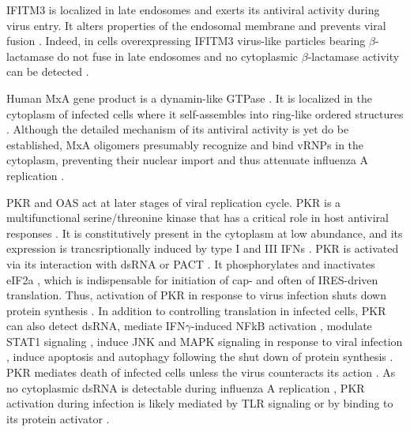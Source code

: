 		\gls{IFITM3} is localized in late endosomes and exerts its antiviral activity during virus entry. It alters properties of the endosomal membrane and prevents viral fusion \parencite{Desai2014}. Indeed, in cells overexpressing \gls{IFITM3} virus-like particles bearing $\beta$-lactamase do not fuse in late endosomes and no cytoplasmic $\beta$-lactamase activity can be detected \parencite{Desai2014}.
		
		Human \gls{MxA} gene product is a dynamin-like \gls{GTPase} \parencite{Nakayama1992}. It is localized in the cytoplasm of infected cells where it self-assembles into ring-like ordered structures \parencite{Gao2010}. Although the detailed mechanism of its antiviral activity is yet do be established, \gls{MxA} oligomers presumably recognize and bind \gls{vRNP}s in the cytoplasm, preventing their nuclear import and thus attenuate influenza A replication \parencite{Haller2010}.
		
		\gls{PKR} and \gls{OAS} act at later stages of viral replication cycle. \gls{PKR} is a multifunctional serine/threonine kinase that has a critical role in host antiviral responses \parencite{Garcia2006a}. It is constitutively present in the cytoplasm at low abundance, and its expression is trancsriptionally induced by type I and III \gls{IFN}s \parencite{Meurs1990}. \gls{PKR} is activated via its interaction with dsRNA or \gls{PACT} \parencite{Li2006a}. It phosphorylates and inactivates \gls{eIF2a} \parencite{Levin1978}, which is indispensable for initiation of cap- and often of \gls{IRES}-driven translation. Thus, activation of \gls{PKR} in response to virus infection shuts down protein synthesis \parencite{Kimball1999}. In addition to controlling translation in infected cells, \gls{PKR} can also detect dsRNA, mediate \gls{IFN}$\gamma$-induced \gls{NFkB} activation \parencite{Deb2001}, modulate \gls{STAT}1 signaling \parencite{Wong1997}, induce \gls{JNK} and \gls{MAPK} signaling in response to viral infection \parencite{Chu1999}, induce apoptosis and autophagy following the shut down of protein synthesis \parencite{Gil2000, Talloczy2002}. \gls{PKR} mediates death of infected cells unless the virus counteracts its action \parencite{Takizawa1996, Hatada1999}. As no cytoplasmic dsRNA is  detectable during influenza A replication \parencite{Wisskirchen2011}, \gls{PKR} activation during infection is likely mediated by \gls{TLR} signaling \parencite{Jiang2003} or by binding to its protein activator \parencite{Garcia2006a}.
		

